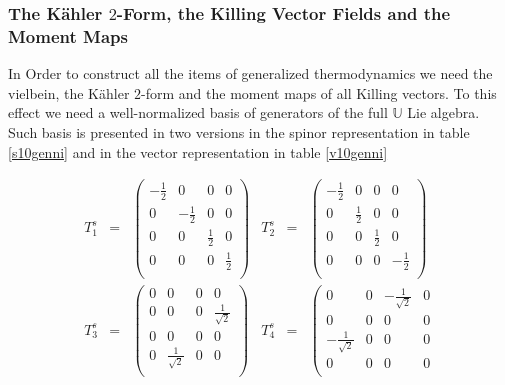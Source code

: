 \documentclass[10pt,a4paper]{article}
\newcommand{\sym}{\mathfrak{sp}}
\begin{document}
\subsubsection{The K\"ahler $2$-Form, the Killing Vector Fields and the Moment Maps}
In Order to construct all the items of generalized thermodynamics we need the vielbein, the K\"ahler $2$-form and the moment
maps of all Killing vectors. To this effect we need a well-normalized basis of generators of the full $\mathbb{U}$ Lie algebra. Such basis is presented in two versions in the spinor representation in table \ref{s10genni} and in the vector representation in table \ref{v10genni}
\begin{table}[htb]
\begin{center}
\caption{\it In this table we display the complete list of the 10 generators  of the $\sym(4,R)$ Lie algebra. \label{s10genni}}
$$
\begin{array}{||ccc||ccc||}
\hline\hline
 T^s_1 & = & \left(
\begin{array}{cccc}
 -\frac{1}{2} & 0 & 0 & 0 \\
 0 & -\frac{1}{2} & 0 & 0 \\
 0 & 0 & \frac{1}{2} & 0 \\
 0 & 0 & 0 & \frac{1}{2} \\
\end{array}
\right) & T^s_2 & = & \left(
\begin{array}{cccc}
 -\frac{1}{2} & 0 & 0 & 0 \\
 0 & \frac{1}{2} & 0 & 0 \\
 0 & 0 & \frac{1}{2} & 0 \\
 0 & 0 & 0 & -\frac{1}{2} \\
\end{array}
\right)\\
\hline
 T^s_3 & = & \left(
\begin{array}{cccc}
 0 & 0 & 0 & 0 \\
 0 & 0 & 0 & \frac{1}{\sqrt{2}} \\
 0 & 0 & 0 & 0 \\
 0 & \frac{1}{\sqrt{2}} & 0 & 0 \\
\end{array}
\right) & T^s_4 & = & \left(
\begin{array}{cccc}
 0 & 0 & -\frac{1}{\sqrt{2}} & 0 \\
 0 & 0 & 0 & 0 \\
 -\frac{1}{\sqrt{2}} & 0 & 0 & 0 \\
 0 & 0 & 0 & 0 \\

\end{array}
\end{array}$$
\end{center}
\end{table}
\end{document}
